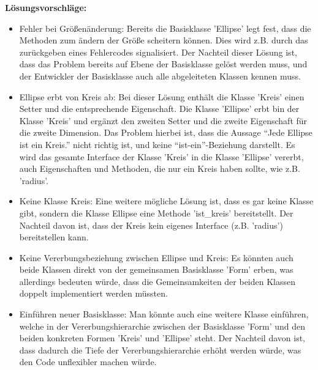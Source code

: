 				{\bfseries Lösungsvorschläge:}
				
					\begin{itemize}
						
						
						\item Fehler bei Größenänderung:
							Bereits die Basisklasse 'Ellipse' legt fest, dass die Methoden zum ändern der Größe scheitern
							können. Dies wird z.B. durch das zurückgeben eines Fehlercodes signalisiert. Der Nachteil
							dieser Lösung ist, dass das Problem bereits auf Ebene der Basisklasse gelöst werden muss, und
							der Entwickler der Basisklasse auch alle abgeleiteten Klassen kennen muss.
							
						\item Ellipse erbt von Kreis ab:
							Bei dieser Lösung enthält die Klasse 'Kreis' einen Setter und die entsprechende Eigenschaft. Die
							Klasse 'Ellipse' erbt bin der Klasse 'Kreis' und ergänzt den zweiten Setter und die zweite
							Eigenschaft für die zweite Dimension. Das Problem hierbei ist, dass die Aussage ``Jede Ellipse
							ist ein Kreis.'' nicht richtig ist, und keine ``ist-ein''-Beziehung darstellt. Es wird das
							gesamte Interface der Klasse 'Kreis' in die Klasse 'Ellipse' vererbt, auch Eigenschaften und
							Methoden, die nur ein Kreis haben sollte, wie z.B. 'radius'.
							
						\item Keine Klasse Kreis:
							Eine weitere mögliche Lösung ist, dass es gar keine Klasse gibt, sondern die Klasse Ellipse
							eine Methode 'ist\_kreis' bereitstellt. Der Nachteil davon ist, dass der Kreis kein eigenes
							Interface (z.B. 'radius') bereitstellen kann.
						
						\item Keine Vererbungsbeziehung zwischen Ellipse und Kreis:
							Es könnten auch beide Klassen direkt von der gemeinsamen Basisklasse 'Form' erben, was
							allerdings bedeuten würde, dass die Gemeinsamkeiten der beiden Klassen doppelt implementiert
							werden müssten.
							
						\item Einführen neuer Basisklasse:
							Man könnte auch eine weitere Klasse einführen, welche in der Vererbungshierarchie zwischen der
							Basisklasse 'Form' und den beiden konkreten Formen 'Kreis' und 'Ellipse' steht. Der Nachteil
							davon ist, dass dadurch die Tiefe der Vererbungshierarchie erhöht werden würde, was den Code
							unflexibler machen würde.
						
					\end{itemize}
					
